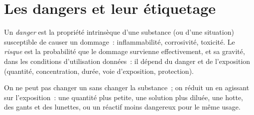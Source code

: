 \section{Les dangers et leur étiquetage}

\begin{definition}\label{def:b1:lab-techniques-1:hazard}
Un \emph{danger} est la propriété intrinsèque d'une
substance (ou d'une situation) susceptible de causer un dommage~:
inflammabilité, corrosivité, toxicité. Le \emph{risque}
est la probabilité que le dommage survienne effectivement, et sa
gravité, dans les conditions d'utilisation données~: il dépend du
danger et de l'exposition (quantité, concentration, durée, voie
d'exposition, protection).
\end{definition}

On ne peut pas changer un  sans changer la substance~; on réduit un
 en agissant sur l'exposition~: une quantité plus petite, une
solution plus diluée, une hotte, des gants et des lunettes, ou un réactif
moins dangereux pour le même usage.

